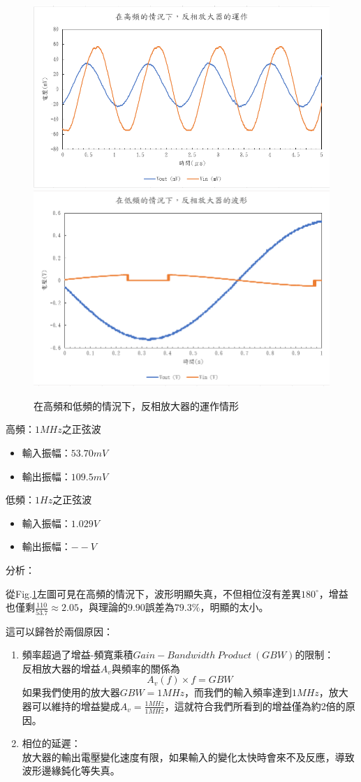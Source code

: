 \documentclass[12pt,a4paper]{article}
\begin{document}
\begin{CJK}{UTF8}{bkai}
\begin{enumerate}
\begin{figure}[h]
    \centering
    \includegraphics[width=0.45\linewidth]{figures/ia/Inverting amplifier_high freq.png}
    \includegraphics[width=0.45\linewidth]{figures/ia/Inverting amplifier_low freq.png}
    \caption{在高頻和低頻的情況下，反相放大器的運作情形}
    \label{fig:IA_freq.}
\end{figure}

高頻：$1MHz$之正弦波
\begin{itemize}
    \item 輸入振幅：$53.70mV$
    \item 輸出振幅：$109.5mV$
\end{itemize}

低頻：$1Hz$之正弦波
\begin{itemize}
    \item 輸入振幅：$1.029V$
    \item 輸出振幅：$--V$
\end{itemize}


\noindent 分析：

從Fig.\ref{fig:IA_freq.}左圖可見在高頻的情況下，波形明顯失真，不但相位沒有差異$180^\circ$，增益也僅剩$\frac{110}{53.7}\approx 2.05$，與理論的$9.90$誤差為$79.3\%$，明顯的太小。

這可以歸咎於兩個原因：
\begin{enumerate}
    \item 頻率超過了增益-頻寬乘積$Gain-Bandwidth\ Product\ (GBW)$的限制：\\
    反相放大器的增益$A_v$與頻率的關係為
    \begin{equation}
        A_v(f) \times f=GBW
        \nonumber
    \end{equation}
    如果我們使用的放大器$GBW=1MHz$，而我們的輸入頻率達到$1MHz$，放大器可以維持的增益變成$A_v=\frac{1MHz}{1MHz}$，這就符合我們所看到的增益僅為約2倍的原因。
    \item 相位的延遲：\\放大器的輸出電壓變化速度有限，如果輸入的變化太快時會來不及反應，導致波形邊緣鈍化等失真。
\end{enumerate}


\end{enumerate}
\end{CJK}
\end{document}
